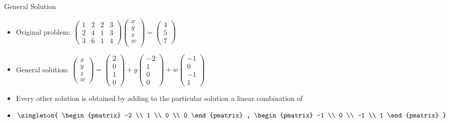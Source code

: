 \documentclass{beamer}
\begin{document}
\begin{frame}{General Solution}

\begin{itemize}
\item
Original problem: $
\begin{pmatrix}
1 & 2 & 2 & 3 \\
2 & 4 & 1 & 3 \\
3 & 6 & 1 & 4
\end{pmatrix}
\begin{pmatrix}
x \\
y \\
z \\
w \\
\end{pmatrix}
=
\begin{pmatrix}
4 \\
5 \\
7
\end{pmatrix}
$
\item
General solution: $
\begin{pmatrix}
x \\ y \\ z \\ w
\end{pmatrix}
=
\begin{pmatrix}
2 \\
0 \\
1 \\
0
\end{pmatrix}
+
y
\begin{pmatrix}
-2 \\
1 \\
0 \\
0
\end{pmatrix}
+
w
\begin{pmatrix}
-1 \\
0 \\
-1 \\
1
\end{pmatrix}
$
\item Every other solution is obtained by adding to the particular solution a linear combination
of
\item
$
\singleton{
\begin{pmatrix}
-2 \\
1 \\
0 \\
0
\end{pmatrix}
,
\begin{pmatrix}
-1 \\
0 \\
-1 \\
1
\end{pmatrix}
}
$

\end{itemize}
\end{frame}
\end{document}

